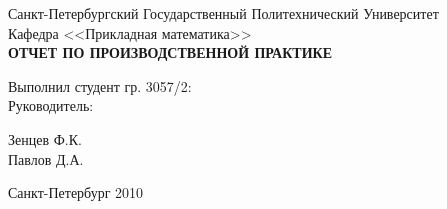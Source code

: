 \begin{titlepage}

\begin{center}

\large Санкт-Петербургский Государственный Политехнический Университет \\
Кафедра <<Прикладная математика>> \\ [8.0cm]
\textbf{\textsc{ОТЧЕТ ПО ПРОИЗВОДСТВЕННОЙ ПРАКТИКЕ}}\\[3.0cm]

\begin{minipage}{0.4\textwidth}
\begin{flushleft} \large
  Выполнил студент гр. 3057/2: \\ [1.0cm]
  Руководитель:
\end{flushleft}
\end{minipage}
\begin{minipage}{0.4\textwidth}
\begin{flushright} \large
Зенцев Ф.К. \\ [1.0cm]
Павлов Д.А.
\end{flushright}
\end{minipage}

\vfill

\large Санкт-Петербург 2010



\end{center}
\end{titlepage}
